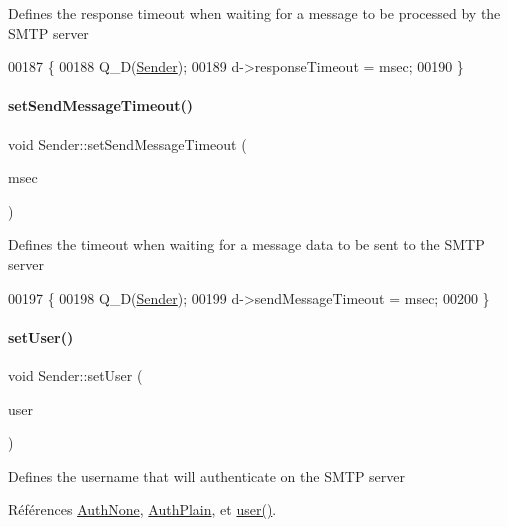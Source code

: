 Defines the response timeout when waiting for a message to be processed by the S\+M\+TP server 
\begin{DoxyCode}
00187 \{
00188     Q\_D(\hyperlink{class_simple_mail_1_1_sender}{Sender});
00189     d->responseTimeout = msec;
00190 \}
\end{DoxyCode}
\mbox{\label{class_simple_mail_1_1_sender_a6fa0ad623c4821205ab75bcfa6735998}} 
\paragraph{\texorpdfstring{set\+Send\+Message\+Timeout()}{setSendMessageTimeout()}}
{\footnotesize\ttfamily void Sender\+::set\+Send\+Message\+Timeout (\begin{DoxyParamCaption}\item[{int}]{msec }\end{DoxyParamCaption})}

Defines the timeout when waiting for a message data to be sent to the S\+M\+TP server 
\begin{DoxyCode}
00197 \{
00198     Q\_D(\hyperlink{class_simple_mail_1_1_sender}{Sender});
00199     d->sendMessageTimeout = msec;
00200 \}
\end{DoxyCode}
\mbox{\label{class_simple_mail_1_1_sender_a20251be6b7b4064cd5f20ea224333c4c}} 
\paragraph{\texorpdfstring{set\+User()}{setUser()}}
{\footnotesize\ttfamily void Sender\+::set\+User (\begin{DoxyParamCaption}\item[{const Q\+String \&}]{user }\end{DoxyParamCaption})}

Defines the username that will authenticate on the S\+M\+TP server 

Références \hyperlink{class_simple_mail_1_1_sender_af50defb714bc3e95f47c71a9ba6ee6bba1dd1824451d663ee54b5a528cd8ced74}{Auth\+None}, \hyperlink{class_simple_mail_1_1_sender_af50defb714bc3e95f47c71a9ba6ee6bba28927645560285ef540f6f2471be4584}{Auth\+Plain}, et \hyperlink{class_simple_mail_1_1_sender_a70ce2ab650d894c40be88d82bd327c3b}{user()}.



